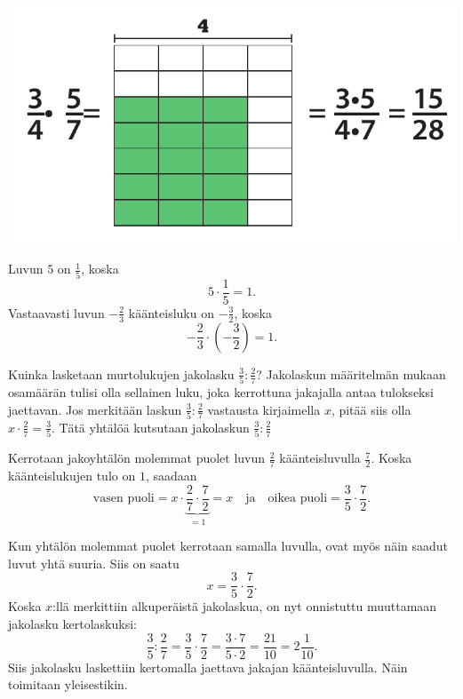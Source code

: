\includegraphics[scale=0.4]{pictures/Kuva3-1-5.pdf}

\begin{esimerkki}
	Luvun $5$  on $\frac{1}{5}$, koska
	\[
	 5\cdot \frac{1}{5}=1.
	\]
	Vastaavasti luvun $-\frac{2}{3}$ käänteisluku on $-\frac{3}{2}$, koska
	\[
	 -\frac{2}{3}\cdot (-\frac{3}{2})=1.
	\]

\end{esimerkki}

\begin{esimerkki}
Kuinka lasketaan murtolukujen jakolasku $\frac 3 5 : \frac 2 7$? Jakolaskun määritelmän mukaan osamäärän tulisi olla sellainen luku, joka kerrottuna jakajalla antaa tulokseksi jaettavan. Jos merkitään laskun $\frac 3 5 : \frac 2 7$ vastausta kirjaimella $x$, pitää siis olla $x \cdot \frac 2 7 = \frac 3 5$.  Tätä yhtälöä kutsutaan jakolaskun $\frac 3 5 : \frac 2 7$ 

Kerrotaan jakoyhtälön molemmat puolet luvun $\frac 2 7$ käänteisluvulla $\frac 7 2$. Koska käänteislukujen tulo on $1$, saadaan
\[
	\text{vasen puoli} = x \cdot \underbrace{\frac 2 7 \cdot \frac 7 2}_{= 1} = x \quad \text{ja} \quad \text{oikea puoli} = \frac 3 5 \cdot \frac 7 2.
\]

Kun yhtälön molemmat puolet kerrotaan samalla luvulla, ovat myös näin saadut luvut yhtä suuria. Siis on saatu
\[
	x = \frac 3 5 \cdot \frac 7 2.
\]
Koska $x$:llä merkittiin alkuperäistä jakolaskua, on nyt onnistuttu muuttamaan jakolasku kertolaskuksi:
\[
	\frac 3 5 : \frac 2 7 = \frac 3 5 \cdot \frac 7 2 = \frac{3 \cdot 7}{5 \cdot 2} = \frac{21}{10} = 2 \frac{1}{10}.
\]
Siis jakolasku laskettiin kertomalla jaettava jakajan käänteisluvulla. Näin toimitaan yleisestikin.
 \end{esimerkki}

